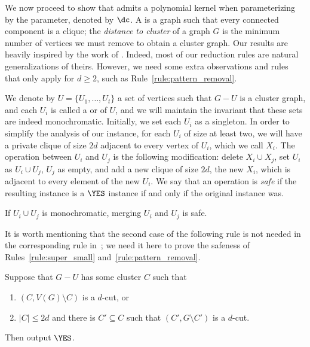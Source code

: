 We now proceed to show that  admits a polynomial kernel when parameterizing by the  parameter, denoted by $\dc$.
A  is a graph such that every connected component is a clique; the \emph{distance to cluster} of a graph $G$ is the minimum number of vertices we must remove to obtain a cluster graph.
Our results are heavily inspired by the work of \cite{matching_cut_ipec}.
Indeed, most of our reduction rules are natural generalizations of theirs. However, we need some extra observations and rules that only apply for $d \geq 2$, such as Rule~\ref{rule:pattern_removal}.



We denote by $U = \{U_1, \dots, U_t\}$ a set of vertices such that $G - U$ is a cluster graph, and each $U_i$ is called a  or  of $U$, and we will maintain the invariant that these sets are indeed monochromatic. Initially, we set each $U_i$ as a singleton.
In order to simplify the analysis of our instance, for each $U_i$ of size at least two, we will have a private clique of size $2d$ adjacent to every vertex of $U_i$, which we call $X_i$.
The  operation between $U_i$ and $U_j$ is the following modification: delete $X_i \cup X_j$, set $U_i$ as $U_i \cup U_j$, $U_j$ as empty, and add a new clique of size $2d$, the new $X_i$, which is adjacent to every element of the new $U_i$.
We say that an operation is \textit{safe} if the resulting instance  is a $\YES$ instance if and only if the original instance was.

\begin{observation}
    If $U_i \cup U_j$ is monochromatic, merging $U_i$ and $U_j$ is safe.
\end{observation}


It is worth mentioning that the second case of the following rule is not needed in the corresponding rule in~\cite{matching_cut_ipec}; we need it here to prove the safeness of Rules~\ref{rule:super_small} and~\ref{rule:pattern_removal}.

\begin{rrule}
    \label{rule:trivial}
    Suppose that $G - U$ has some cluster $C$ such that
    \begin{enumerate}
        \item $(C, V(G) \setminus C)$ is a $d$-cut, or
        \item $|C| \leq 2d$ and there is $C' \subseteq C$ such that $(C', G \setminus C')$ is a $d$-cut.
    \end{enumerate}
    Then output $\YES$.
\end{rrule}

